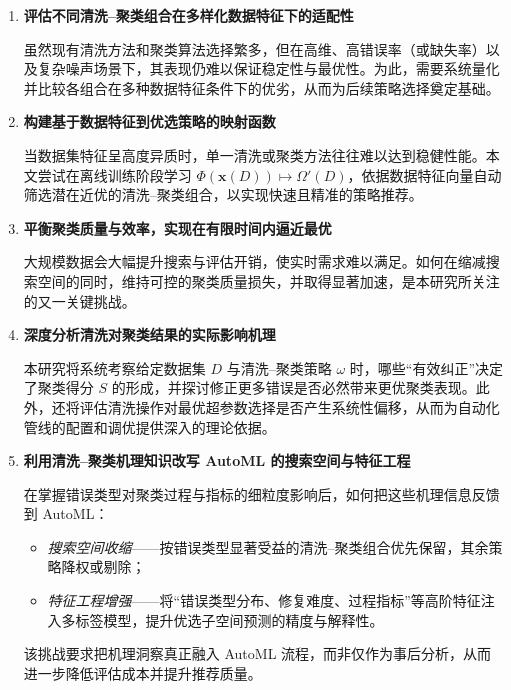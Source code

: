 \documentclass[10pt]{article} %
\numberwithin{equation}{section}
\begin{document}
\begin{enumerate}[label=($Q_{\arabic*}$), leftmargin=25pt]
    \item \textbf{评估不同清洗–聚类组合在多样化数据特征下的适配性}

    虽然现有清洗方法和聚类算法选择繁多，但在高维、高错误率（或缺失率）以及复杂噪声场景下，其表现仍难以保证稳定性与最优性。为此，需要系统量化并比较各组合在多种数据特征条件下的优劣，从而为后续策略选择奠定基础。

    \item \textbf{构建基于数据特征到优选策略的映射函数}

    当数据集特征呈高度异质时，单一清洗或聚类方法往往难以达到稳健性能。本文尝试在离线训练阶段学习
    \(\Phi(\mathbf{x}(D)) \mapsto \Omega'(D)\)，依据数据特征向量自动筛选潜在近优的清洗–聚类组合，以实现快速且精准的策略推荐。

    \item \textbf{平衡聚类质量与效率，实现在有限时间内逼近最优}

    大规模数据会大幅提升搜索与评估开销，使实时需求难以满足。如何在缩减搜索空间的同时，维持可控的聚类质量损失，并取得显著加速，是本研究所关注的又一关键挑战。

    \item \textbf{深度分析清洗对聚类结果的实际影响机理}

    本研究将系统考察给定数据集 \(D\) 与清洗–聚类策略 \(\omega\) 时，哪些“有效纠正”决定了聚类得分 \(S\) 的形成，并探讨修正更多错误是否必然带来更优聚类表现。此外，还将评估清洗操作对最优超参数选择是否产生系统性偏移，从而为自动化管线的配置和调优提供深入的理论依据。

    \item \textbf{利用清洗–聚类机理知识改写 AutoML 的搜索空间与特征工程}

          在掌握错误类型对聚类过程与指标的细粒度影响后，如何把这些机理信息反馈到 AutoML：  
          \begin{itemize}[nosep,leftmargin=*,topsep=2pt]
              \item \emph{搜索空间收缩}——按错误类型显著受益的清洗–聚类组合优先保留，其余策略降权或剔除；  
              \item \emph{特征工程增强}——将“错误类型分布、修复难度、过程指标”等高阶特征注入多标签模型，提升优选子空间预测的精度与解释性。  
          \end{itemize}
          该挑战要求把机理洞察真正融入 AutoML 流程，而非仅作为事后分析，从而进一步降低评估成本并提升推荐质量。
\end{enumerate}
\end{document}
